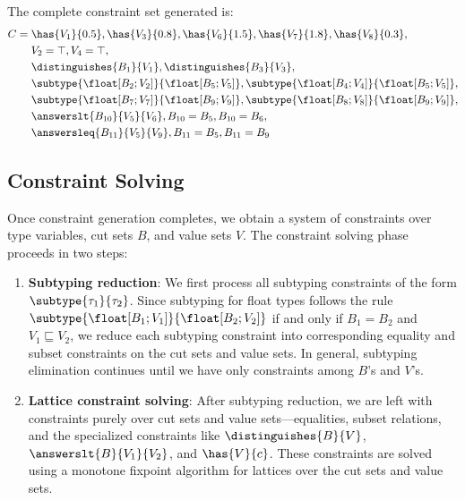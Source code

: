 \begin{example}
    The complete constraint set generated is:
    \begin{align*}
    C = &\; \has{V_1}{0.5}, \has{V_3}{0.8}, \has{V_6}{1.5}, \has{V_7}{1.8}, \has{V_8}{0.3}, \\
        &\; V_2 = \top, V_4 = \top, \\
        &\; \distinguishes{B_1}{V_1}, \distinguishes{B_3}{V_3}, \\
        &\; \subtype{\float[B_2; V_2]}{\float[B_5; V_5]}, \subtype{\float[B_4; V_4]}{\float[B_5; V_5]}, \\
        &\; \subtype{\float[B_7; V_7]}{\float[B_9; V_9]}, \subtype{\float[B_8; V_8]}{\float[B_9; V_9]}, \\
        &\; \answerslt{B_{10}}{V_5}{V_6}, B_{10} = B_5, B_{10} = B_6, \\
        &\; \answersleq{B_{11}}{V_5}{V_9}, B_{11} = B_5, B_{11} = B_9
    \end{align*}
\end{example}

\subsection{Constraint Solving}
Once constraint generation completes, we obtain a system of constraints over type variables, cut sets $B$, and value sets $V$. The constraint solving phase proceeds in two steps:

\begin{enumerate}
    \item \textbf{Subtyping reduction}: We first process all subtyping constraints of the form $\subtype{\tau_1}{\tau_2}$. Since subtyping for float types follows the rule $\subtype{\float[B_1;V_1]}{\float[B_2;V_2]}$ if and only if $B_1 = B_2$ and $V_1 \sqsubseteq V_2$, we reduce each subtyping constraint into corresponding equality and subset constraints on the cut sets and value sets. In general, subtyping elimination continues until we have only constraints among $B$'s and $V$'s.
    
    \item \textbf{Lattice constraint solving}: After subtyping reduction, we are left with constraints purely over cut sets and value sets—equalities, subset relations, and the specialized constraints like $\distinguishes{B}{V}$, $\answerslt{B}{V_1}{V_2}$, and $\has{V}{c}$. These constraints are solved using a monotone fixpoint algorithm for lattices over the cut sets and value sets.
\end{enumerate}

